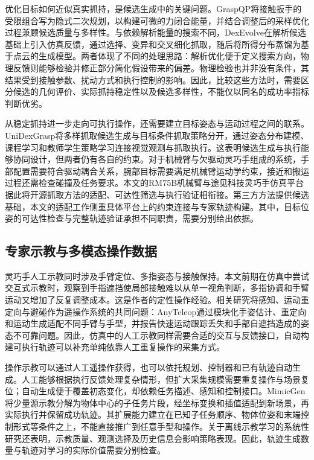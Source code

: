 优化目标如何近似真实抓持，是候选生成中的关键问题。GraspQP将接触扳手的受限组合写为隐式二次规划，以构建可微的力闭合能量，并结合调整后的采样优化过程兼顾候选质量与多样性\cite{zurbrugg2025graspqp}。与依赖解析能量的搜索不同，DexEvolve在解析候选基础上引入仿真反馈，通过选择、变异和交叉细化抓取，随后将所得分布蒸馏为基于点云的生成模型\cite{zurbrugg2026dexevolve}。两者体现了不同的处理思路：解析优化便于定义搜索方向，物理反馈则能够检验并修正部分简化假设带来的偏差。物理检验也并非没有条件，其结果受到接触参数、扰动方式和执行控制的影响。因此，比较这些方法时，需要区分候选的几何评价、实际抓持稳定性以及候选多样性，不能仅以同名的成功率指标判断优劣。

从稳定抓持进一步走向可执行操作，还需要建立目标姿态与运动过程之间的联系。UniDexGrasp将多样抓取候选生成与目标条件抓取策略分开，通过姿态分布建模、课程学习和教师学生策略学习连接视觉观测与抓取执行\cite{xu2023unidexgrasp}。这表明候选生成与执行能够协同设计，但两者仍有各自的约束。对于机械臂与欠驱动灵巧手组成的系统，手部配置需要符合驱动耦合关系，腕部目标需要满足机械臂运动学约束，接近和搬运过程还需检查碰撞及任务要求。本文的RM75B机械臂与途见科技灵巧手仿真平台据此将开源抓取方法的适配、可达性筛选与执行验证相衔接。第三方方法提供候选基础，本文的适配工作侧重具体平台上的约束连接与专家轨迹构建。其中，目标位姿的可达性检查与完整轨迹验证承担不同职责，需要分别给出依据。

\subsection{专家示教与多模态操作数据}
\label{subsec:demonstrations_multimodal_data}

灵巧手人工示教同时涉及手臂定位、多指姿态与接触保持。本文前期在仿真中尝试交互式示教时，观察到手指遮挡使局部接触难以从单一视角判断，多指协调和手臂运动又增加了反复调整成本。这是作者的定性操作经验。相关研究将感知、运动重定向与避碰作为遥操作系统的共同问题：AnyTeleop通过模块化手姿估计、重定向和运动生成适配不同手臂与手型，并报告快速运动跟踪丢失和手部自遮挡造成的姿态不可靠问题\cite{qin2023anyteleop}。因此，仿真中的人工示教同样需要合适的交互与反馈接口，自动构建可执行轨迹可以补充单纯依靠人工重复操作的采集方式。

操作示教可以通过人工遥操作获得，也可以依托规划、控制器和已有轨迹自动生成。人工能够根据执行反馈处理复杂情形，但扩大采集规模需要重复操作与场景复位；自动生成便于覆盖初态变化，却依赖任务描述、感知和控制接口。MimicGen将少量源示教分解为物体中心的子任务片段，经坐标变换和插值适配到新场景，再实际执行并保留成功轨迹\cite{mandlekar2023mimicgen}。其扩展能力建立在已知子任务顺序、物体位姿和末端控制形式等条件之上，不能直接推广到任意手型和操作。关于离线示教学习的系统性研究还表明，示教质量、观测选择及历史信息会影响策略表现\cite{mandlekar2022demonstrations}。因此，轨迹生成数量与轨迹对学习的实际价值需要分别检查。

